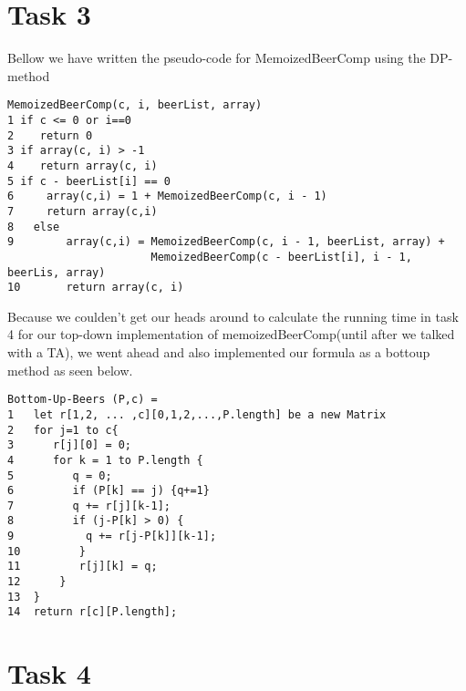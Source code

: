 \documentclass[12pt]{article}
\begin{document}
\section{Task 3}
Bellow we have written the pseudo-code for MemoizedBeerComp using the DP-method\\
\begin{verbatim}
MemoizedBeerComp(c, i, beerList, array)
1 if c <= 0 or i==0
2    return 0
3 if array(c, i) > -1
4    return array(c, i)
5 if c - beerList[i] == 0
6     array(c,i) = 1 + MemoizedBeerComp(c, i - 1)
7     return array(c,i)
8   else
9        array(c,i) = MemoizedBeerComp(c, i - 1, beerList, array) +
                      MemoizedBeerComp(c - beerList[i], i - 1, beerLis, array)
10       return array(c, i)
\end{verbatim}
Because we coulden't get our heads around to calculate the running time in task 4 for our top-down implementation of memoizedBeerComp(until after we talked with a TA), we went ahead and also implemented our formula as a botto\-up method as seen below.
\begin{verbatim}
Bottom-Up-Beers (P,c) = 
1   let r[1,2, ... ,c][0,1,2,...,P.length] be a new Matrix
2   for j=1 to c{
3      r[j][0] = 0;
4      for k = 1 to P.length {
5         q = 0;
6         if (P[k] == j) {q+=1}
7         q += r[j][k-1];
8         if (j-P[k] > 0) {
9           q += r[j-P[k]][k-1];
10         }
11         r[j][k] = q;	
12      }
13  }
14	return r[c][P.length];
\end{verbatim}
\section{Task 4}



\end{document}
